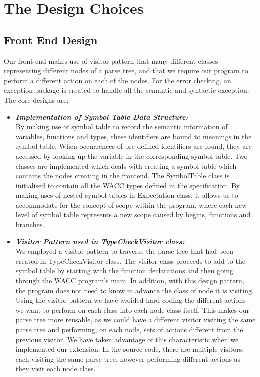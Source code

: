 \documentclass[a4paper]{article}
\theoremstyle{definition}
\begin{document}
\section{The Design Choices}
\subsection{Front End Design}
Our front end makes use of visitor pattern that many different classes representing different nodes of a parse tree, and that we require our program to perform a different action on each of the nodes. For the error checking, an exception package is created to handle all the semantic and syntactic exception. The core designs are:

\begin{itemize}
\item\textbf{\textit{Implementation of Symbol Table Data Structure:}}
\\
By making use of symbol table to record the semantic information of variables, functions and types, these identifiers are bound to meanings in the symbol table. When occurrences of pre-defined identifiers are found, they are accessed by looking up the variable in the corresponding symbol table. Two classes are implemented which deals with creating a symbol table which contains the nodes creating in the frontend. The SymbolTable class is initialised to contain all the WACC types defined in the specification. By making uses of nested symbol tables in Expectation class, it allows us to accommodate for the concept of scope within the program, where each new level of symbol table represents a new scope caused by begins, functions and branches.
\end{itemize}

\begin{itemize}
\item\textbf{\textit{ Visitor Pattern used in TypeCheckVisitor class:}}
\\
We  employed a visitor pattern to traverse the parse tree that had been created in TypeCheckVisitor class. The visitor class proceeds to add to the symbol table by starting with the function declarations and then going through the WACC program’s main. In addition, with this design pattern, the program does not need to know in advance the class of node it is visiting. Using the visitor pattern we have avoided hard coding the different actions we want to perform on each class into each node class itself. This makes our parse tree more reusable, as we could have a different visitor visiting the same parse tree and performing, on each node, sets of actions different from the previous visitor. We have taken advantage of this characteristic when we implemented our extension. In the source code, there are multiple visitors, each visiting the same parse tree, however performing different actions as they visit each node class.
\end{itemize}
\end{document}
